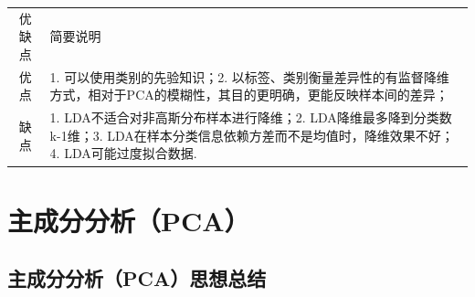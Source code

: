 \begin{longtable}[]{ cl }
\begin{minipage}[b]{0.05\columnwidth}\centering\strut
优缺点\strut
\end{minipage} & \begin{minipage}[b]{0.04\columnwidth}\raggedright\strut
简要说明\strut
\end{minipage}\tabularnewline
\begin{minipage}[t]{0.05\columnwidth}\centering\strut
优点\strut
\end{minipage} & \begin{minipage}[t]{0.04\columnwidth}\raggedright\strut
1. 可以使用类别的先验知识；2.
以标签、类别衡量差异性的有监督降维方式，相对于PCA的模糊性，其目的更明确，更能反映样本间的差异；\strut
\end{minipage}\tabularnewline
\begin{minipage}[t]{0.05\columnwidth}\centering\strut
缺点\strut
\end{minipage} & \begin{minipage}[t]{0.04\columnwidth}\raggedright\strut
1. LDA不适合对非高斯分布样本进行降维；2. LDA降维最多降到分类数k-1维；3.
LDA在样本分类信息依赖方差而不是均值时，降维效果不好；4.
LDA可能过度拟合数据.\strut
\end{minipage}\tabularnewline
\end{longtable}

\section{主成分分析（PCA）}\label{ux4e3bux6210ux5206ux5206ux6790pca}

\subsection{主成分分析（PCA）思想总结}\label{ux4e3bux6210ux5206ux5206ux6790pcaux601dux60f3ux603bux7ed3}

